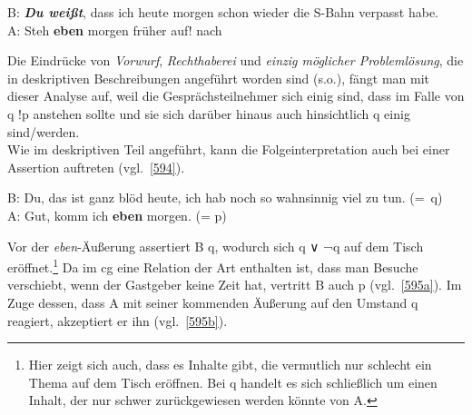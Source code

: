 \begin{exe}
	\ex\label{593}
	B: \textbf{\textit{Du weißt}}, dass ich heute morgen schon wieder die S-Bahn verpasst habe.\\
	A: Steh \textbf{eben} morgen früher auf!	  
	\hfill\hbox{nach \citet[122]{Thurmair1989}}
\end{exe}			
Die Eindrücke von \textit{Vorwurf}, \textit{Rechthaberei} und \textit{einzig möglicher Problemlösung}, die in deskriptiven Beschreibungen angeführt worden sind (s.o.), fängt man mit dieser Analyse auf, weil die Gesprächsteilnehmer sich einig sind, dass im Falle von q !p anstehen sollte und sie sich darüber hinaus auch hinsichtlich q einig sind/werden.\\
\newline
Wie im deskriptiven Teil angeführt, kann die Folgeinterpretation auch bei einer Assertion auftreten (vgl.\ \ref{594}).
\begin{exe}
	\ex\label{594}
	B: Du, das ist ganz blöd heute, ich hab noch so wahnsinnig viel zu tun.
	\newline
	\hbox{}\hfill\hbox{(= q)} \\
	A: Gut, komm ich \textbf{eben} morgen. (= p)
	\hfill\hbox{\citet[121]{Thurmair1989}}
\end{exe}
Vor der \textit{eben}-Äußerung assertiert B q, wodurch sich q ∨ ¬q auf dem Tisch eröffnet.\footnote{Hier zeigt sich auch, dass es Inhalte gibt, die vermutlich nur schlecht ein Thema auf dem Tisch eröffnen. Bei q handelt es sich schließlich um einen Inhalt, der nur schwer zurückgewiesen werden könnte von A.} Da im cg eine Relation der Art enthalten ist, dass man Besuche verschiebt, wenn der Gastgeber keine Zeit hat, vertritt B auch p (vgl.\ \ref{595a}). Im Zuge dessen, dass A mit seiner kommenden Äußerung auf den Umstand q reagiert, akzeptiert er ihn (vgl.\ \ref{595b}).


